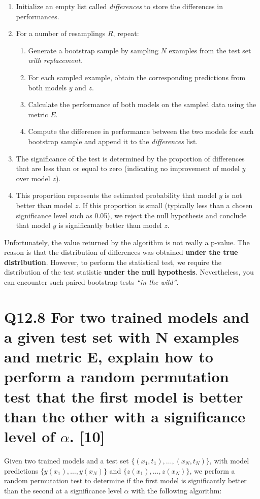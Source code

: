 \documentclass[11pt]{article}
\begin{document}
\begin{enumerate}
    \item Initialize an empty list called \textit{differences} to store the differences in performances.
    \item For a number of resamplings \(R\), repeat:
    \begin{enumerate}
        \item Generate a bootstrap sample by sampling \(N\) examples from the test set \textit{with replacement}.
        \item For each sampled example, obtain the corresponding predictions from both models \(y\) and \(z\).
        \item Calculate the performance of both models on the sampled data using the metric \(E\).
        \item Compute the difference in performance between the two models for each bootstrap sample and append it to the \textit{differences} list.
    \end{enumerate}
    \item The significance of the test is determined by the proportion of differences that are less than or equal to zero (indicating no improvement of model \(y\) over model \(z\)).
    \item This proportion represents the estimated probability that model \(y\) is not better than model \(z\). If this proportion is small (typically less than a chosen significance level such as 0.05), we reject the null hypothesis and conclude that model \(y\) is significantly better than model \(z\).
\end{enumerate}

Unfortunately, the value returned by the algorithm is not really a p-value. The reason is that the distribution of differences was obtained \textbf{under the true distribution}. However, to perform the statistical test, we require the distribution of the test statistic \textbf{under the null hypothesis}. Nevertheless, you can encounter such paired bootstrap tests \textit{``in the wild''}.

\section{Q12.8 For two trained models and a given test set with N examples and metric E, explain how to perform a random permutation test that the first model is better than the other with a significance level of $\alpha$. [10]}

Given two trained models and a test set $\{ (x_1, t_1), \ldots, (x_N, t_N) \}$, with model predictions $\{y(x_1), \ldots, y(x_N)\}$ and $\{z(x_1), \ldots, z(x_N)\}$, we perform a random permutation test to determine if the first model is significantly better than the second at a significance level \( \alpha \) with the following algorithm:
\end{document}
